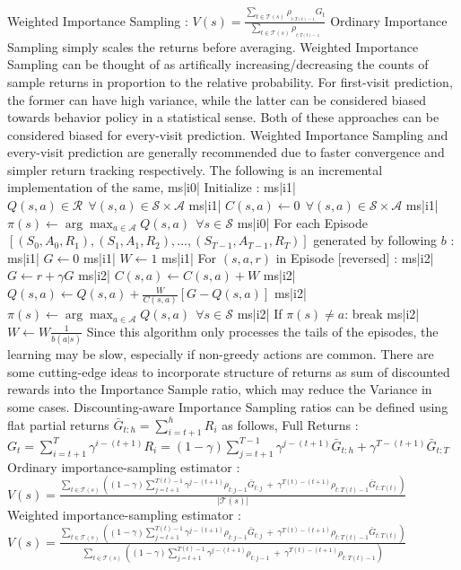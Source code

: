 Weighted Importance Sampling : \( V(s) = \frac{\sum_{t \in \mathcal{T}(s)} \rho_{_{t:T(t) - 1}} G_t}{ \sum_{t \in \mathcal{T}(s)} \rho_{_{t:T(t) - 1}} } \)
Ordinary Importance Sampling simply scales the returns before averaging. Weighted Importance Sampling can be thought of as artifically increasing/decreasing the counts of sample returns in proportion to the relative probability. For first-visit prediction, the former can have high variance, while the latter can be considered biased towards behavior policy in a statistical sense. Both of these approaches can be considered biased for every-visit prediction.
Weighted Importance Sampling and every-visit prediction are generally recommended due to faster convergence and simpler return tracking respectively. The following is an incremental implementation of the same,
ms|i0| Initialize :
ms|i1| \( Q(s, a) \in \mathcal{R} \ \ \forall (s,a) \in \mathcal{S} \times \mathcal{A} \)
ms|i1| \( C(s, a) \leftarrow 0 \ \ \forall (s, a) \in \mathcal{S} \times \mathcal{A} \)
ms|i1| \( \pi(s) \leftarrow \arg\max_{a \in \mathcal{A}} Q(s, a) \ \ \forall s \in \mathcal{S} \)
ms|i0| For each Episode \([(S_0, A_0, R_1), (S_1, A_1, R_2),..., (S_{T-1}, A_{T-1}, R_T)] \) generated by following \( b \) :
ms|i1| \( G \leftarrow 0 \)
ms|i1| \( W \leftarrow 1\)
ms|i1| For \( (s,a,r) \) in Episode [reversed] :
ms|i2| \( G \leftarrow r + \gamma G \)
ms|i2| \( C(s, a) \leftarrow C(s, a) + W \)
ms|i2| \( Q(s,a) \leftarrow Q(s, a) + \frac{W}{C(s, a)} [G - Q(s, a)] \)
ms|i2| \( \pi(s) \leftarrow \arg\max_{a \in \mathcal{A}} Q(s, a) \ \ \forall s \in \mathcal{S} \)
ms|i2| If \( \pi(s) \ne a \): break
ms|i2| \( W \leftarrow W \frac{1}{b(a|s)} \)
Since this algorithm only processes the tails of the episodes, the learning may be slow, especially if non-greedy actions are common. There are some cutting-edge ideas to incorporate structure of returns as sum of discounted rewards into the Importance Sample ratio, which may reduce the Variance in some cases.
Discounting-aware Importance Sampling ratios can be defined using flat partial returns \( \bar{G}_{t:h} = \sum_{i=t+1}^h R_i \) as follows,
Full Returns : \( G_t = \sum_{i=t+1}^T \gamma^{i - (t+1)} R_i = (1 - \gamma) \sum_{j = t+1}^{T-1} \gamma^{j - (t + 1)} \bar{G}_{t:h} + \gamma^{T-(t+1)} \bar{G}_{t:T} \)
Ordinary importance-sampling estimator : \( V(s) = \frac{ \sum_{t \in \mathcal{T}(s)} ( (1 - \gamma) \sum_{j = t+1}^{T(t) - 1} \gamma^{j - (t+1)} \rho_{t:j-1} \bar{G}_{t:j} \ + \ \gamma^{T(t) - (t + 1)} \rho_{t:T(t)-1} \bar{G}_{t:T(t)} ) }{|\mathcal{T}(s)|} \)
Weighted importance-sampling estimator : \( V(s) = \frac{ \sum_{t \in \mathcal{T}(s)} ( (1 - \gamma) \sum_{j = t+1}^{T(t) - 1} \gamma^{j - (t+1)} \rho_{t:j-1} \bar{G}_{t:j} \ + \ \gamma^{T(t) - (t + 1)} \rho_{t:T(t)-1} \bar{G}_{t:T(t)} ) }{ \sum_{t \in \mathcal{T}(s)} ( (1 - \gamma) \sum_{j = t+1}^{T(t) - 1} \gamma^{j - (t+1)} \rho_{t:j-1} \ + \ \gamma^{T(t) - (t + 1)} \rho_{t:T(t)-1} ) } \)
